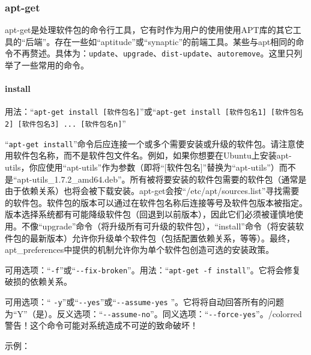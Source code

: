 \subsubsection{apt-get}
\cite{manaptget}\par
apt-get是处理软件包的命令行工具，它有时作为用户的使用使用APT库的其它工具的“后端”。存在一些如“aptitude”或“synaptic”的前端工具。某些与apt相同的命令不再赘述。具体为：\verb|update|、\verb|upgrade|、\verb|dist-update|、\verb|autoremove|。这里只列举了一些常用的命令。\par
\paragraph{install}
用法：“\verb|apt-get install [软件包名]|”或“\verb|apt-get install [软件包名1] [软件包名2] [软件包名3] ... [软件包名n]|”\par
“\verb|apt-get install|”命令后应连接一个或多个需要安装或升级的软件包。请注意使用软件包名称，而不是软件包文件名。例如，如果你想要在Ubuntu上安装apt-utils，你应使用“apt-utils”作为参数（即将“[软件包名]”替换为“apt-utils”）而不是“apt-utils\_1.7.2\_amd64.deb”。所有被将要安装的软件包需要的软件包（通常是由于依赖关系）也将会被下载安装。apt-get会按“/etc/apt/sources.list”寻找需要的软件包。软件包的版本可以通过在软件包名称后连接等号及软件包版本被指定。版本选择系统都有可能降级软件包（回退到以前版本），因此它们必须被谨慎地使用。不像“upgrade”命令（将升级所有可升级的软件包），“install”命令（将安装软件包的最新版本）允许你升级单个软件包（包括配置依赖关系，等等）。最终，apt\_preferences中提供的机制允许你为单个软件包创造可选的安装政策。\par
可用选项：“\verb|-f|”或“\verb|--fix-broken|”。用法：“\verb|apt-get -f install|”。它将会修复破损的依赖关系。\par
可用选项：“ \verb|-y|”或“\verb|--yes|”或“\verb|--assume-yes| ”。它将将自动回答所有的问题为“Y”（是）。反义选项：“\verb|--assume-no|”。同义选项：“\verb|--force-yes|”。{/color{red}{警告！这个命令可能对系统造成不可逆的致命破坏！}}\par
示例：
